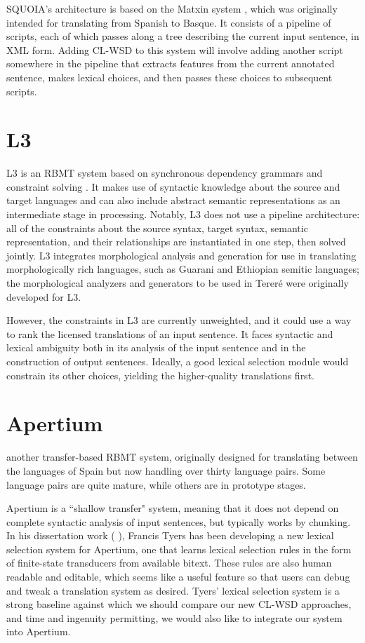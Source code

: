 SQUOIA's architecture is based on the Matxin system \cite{matxin2005}, which
was originally intended for translating from Spanish to Basque.
It consists of a pipeline of scripts, each of which passes along a tree
describing the current input sentence, in XML form. Adding CL-WSD to this
system will involve adding another script somewhere in the pipeline that
extracts features from the current annotated sentence, makes lexical choices,
and then passes these choices to subsequent scripts.

\section{L3}
L3 is an RBMT system based on synchronous dependency grammars and constraint
solving \cite{gasser:sxdg,gasser:aflat2012}.  It makes use of syntactic
knowledge about the source and target languages and can also include abstract
semantic representations as an intermediate stage in processing. Notably, L3
does not use a pipeline architecture: all of the constraints about the source
syntax, target syntax, semantic representation, and their relationships are
instantiated in one step, then solved jointly. L3 integrates morphological
analysis and generation for use in translating morphologically rich languages,
such as Guarani and Ethiopian semitic languages;
the morphological analyzers and generators to be used in Tereré were originally
developed for L3.

However, the constraints in L3 are currently unweighted, and it could use a way
to rank the licensed translations of an input sentence. It faces syntactic and
lexical ambiguity both in its analysis of the input sentence and in the
construction of output sentences. Ideally, a good lexical selection module
would constrain its other choices, yielding the higher-quality translations
first.

\section{Apertium}
another transfer-based RBMT system, originally designed for translating between
the languages of Spain but now handling over thirty language pairs. Some
language pairs are quite mature, while others are in prototype stages.

Apertium is a ``shallow transfer" system, meaning that it does not depend on
complete syntactic analysis of input sentences, but typically works by
chunking.
In his dissertation work (\cite{tyers-fst} \cite{tyers-dissertation}), Francis
Tyers has
been developing a new lexical selection system for Apertium, one that learns
lexical selection rules in the form of finite-state transducers from available
bitext. These rules are also human readable and editable, which seems like a
useful feature so that users can debug and tweak a translation system as
desired.
Tyers' lexical selection system is a strong baseline against which we should
compare our new CL-WSD approaches, and time and ingenuity permitting, we would
also like to integrate our system into Apertium.



